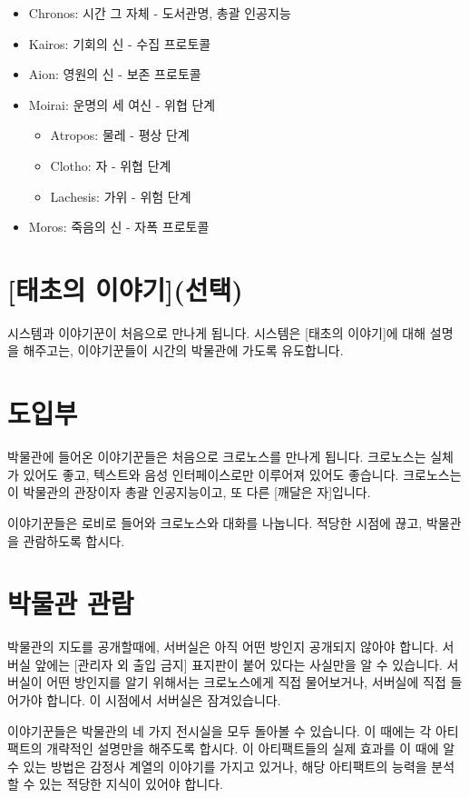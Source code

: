 \documentclass{report}
\begin{document}
	\begin{itemize}
		\item Chronos: 시간 그 자체 - 도서관명, 총괄 인공지능
		\item Kairos: 기회의 신 - 수집 프로토콜
		\item Aion: 영원의 신 - 보존 프로토콜
		\item Moirai: 운명의 세 여신 - 위협 단계
		\begin{itemize}
			\item Atropos: 물레 - 평상 단계
			\item Clotho: 자 - 위협 단계
			\item Lachesis: 가위 - 위험 단계
		\end{itemize}
		\item Moros: 죽음의 신 - 자폭 프로토콜
	\end{itemize}
	
	\section*{[태초의 이야기](선택)}
	시스템과 이야기꾼이 처음으로 만나게 됩니다. 시스템은 [태초의 이야기]에 대해 설명을 해주고는, 이야기꾼들이 시간의 박물관에 가도록 유도합니다.
	
	\section*{도입부}
	박물관에 들어온 이야기꾼들은 처음으로 크로노스를 만나게 됩니다. 크로노스는 실체가 있어도 좋고, 텍스트와 음성 인터페이스로만 이루어져 있어도 좋습니다. 크로노스는 이 박물관의 관장이자 총괄 인공지능이고, 또 다른 [깨달은 자]입니다.
	
	이야기꾼들은 로비로 들어와 크로노스와 대화를 나눕니다. 적당한 시점에 끊고, 박물관을 관람하도록 합시다.
	
	\section*{박물관 관람}
	박물관의 지도를 공개할때에, 서버실은 아직 어떤 방인지 공개되지 않아야 합니다. 서버실 앞에는 [관리자 외 출입 금지] 표지판이 붙어 있다는 사실만을 알 수 있습니다. 서버실이 어떤 방인지를 알기 위해서는 크로노스에게 직접 물어보거나, 서버실에 직접 들어가야 합니다. 이 시점에서 서버실은 잠겨있습니다.
	
	이야기꾼들은 박물관의 네 가지 전시실을 모두 돌아볼 수 있습니다. 이 때에는 각 아티팩트의 개략적인 설명만을 해주도록 합시다. 이 아티팩트들의 실제 효과를 이 때에 알 수 있는 방법은 감정사 계열의 이야기를 가지고 있거나, 해당 아티팩트의 능력을 분석할 수 있는 적당한 지식이 있어야 합니다.
	
\end{document}
